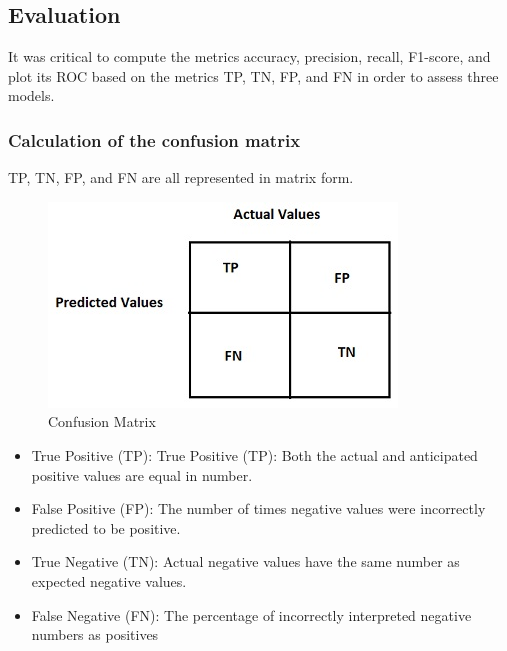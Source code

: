 \subsection{Evaluation}
It was critical to compute the metrics accuracy, precision, recall, F1-score, and plot its ROC based on the metrics TP, TN, FP, and FN in order to assess three models.
\subsubsection{Calculation of the confusion matrix}
TP, TN, FP, and FN are all represented in matrix form.
\begin{figure}
    \centering
    \includegraphics{v7.jpg}
    \caption{Confusion Matrix}
    \label{Confusion Matrix}
\end{figure}

\begin{itemize}
    \item True Positive (TP): True Positive (TP): Both the actual and anticipated positive values are equal in number.
\item False Positive (FP): The number of times negative values were incorrectly predicted to be positive.
\item True Negative (TN): Actual negative values have the same number as expected negative values.
\item False Negative (FN): The percentage of incorrectly interpreted negative numbers as positives
\end{itemize}
